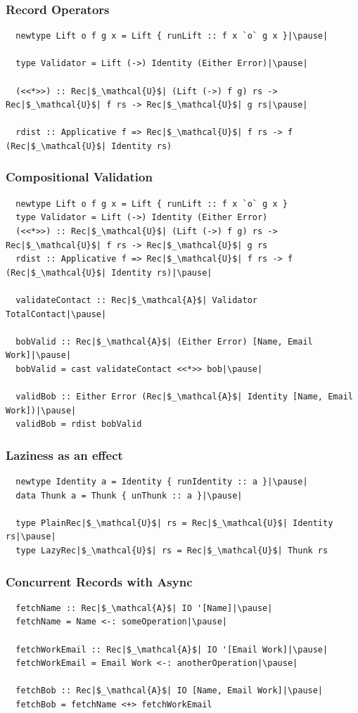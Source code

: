 \documentclass[12pt]{beamer}
\begin{document}
\begin{frame}[fragile]
  \frametitle{Record Operators}\pause

  \begin{lstlisting}
  newtype Lift o f g x = Lift { runLift :: f x `o` g x }|\pause|

  type Validator = Lift (->) Identity (Either Error)|\pause|

  (<<*>>) :: Rec|$_\mathcal{U}$| (Lift (->) f g) rs -> Rec|$_\mathcal{U}$| f rs -> Rec|$_\mathcal{U}$| g rs|\pause|

  rdist :: Applicative f => Rec|$_\mathcal{U}$| f rs -> f (Rec|$_\mathcal{U}$| Identity rs)
  \end{lstlisting}
\end{frame}

\begin{frame}[fragile]
  \frametitle{Compositional Validation}

  \begin{lstlisting}
  newtype Lift o f g x = Lift { runLift :: f x `o` g x }
  type Validator = Lift (->) Identity (Either Error)
  (<<*>>) :: Rec|$_\mathcal{U}$| (Lift (->) f g) rs -> Rec|$_\mathcal{U}$| f rs -> Rec|$_\mathcal{U}$| g rs
  rdist :: Applicative f => Rec|$_\mathcal{U}$| f rs -> f (Rec|$_\mathcal{U}$| Identity rs)|\pause|

  validateContact :: Rec|$_\mathcal{A}$| Validator TotalContact|\pause|

  bobValid :: Rec|$_\mathcal{A}$| (Either Error) [Name, Email Work]|\pause|
  bobValid = cast validateContact <<*>> bob|\pause|

  validBob :: Either Error (Rec|$_\mathcal{A}$| Identity [Name, Email Work])|\pause|
  validBob = rdist bobValid
  \end{lstlisting}
\end{frame}

\begin{frame}[fragile]
  \frametitle{Laziness as an effect}\pause

  \begin{lstlisting}
  newtype Identity a = Identity { runIdentity :: a }|\pause|
  data Thunk a = Thunk { unThunk :: a }|\pause|

  type PlainRec|$_\mathcal{U}$| rs = Rec|$_\mathcal{U}$| Identity rs|\pause|
  type LazyRec|$_\mathcal{U}$| rs = Rec|$_\mathcal{U}$| Thunk rs
  \end{lstlisting}
\end{frame}

\begin{frame}[fragile]
  \frametitle{Concurrent Records with Async}\pause

  \begin{lstlisting}
  fetchName :: Rec|$_\mathcal{A}$| IO '[Name]|\pause|
  fetchName = Name <-: someOperation|\pause|

  fetchWorkEmail :: Rec|$_\mathcal{A}$| IO '[Email Work]|\pause|
  fetchWorkEmail = Email Work <-: anotherOperation|\pause|

  fetchBob :: Rec|$_\mathcal{A}$| IO [Name, Email Work]|\pause|
  fetchBob = fetchName <+> fetchWorkEmail
  \end{lstlisting}
\end{frame}
\end{document}
